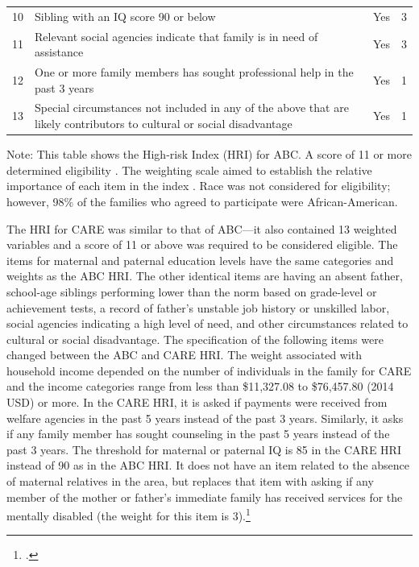 \begin{table}[htbp]
\begin{tabular}{c L{30em} c c}
10 	& Sibling with an IQ score 90 or below	& Yes & 3 \\
11	& Relevant social agencies indicate that family is in need of assistance & Yes & 3 \\
12 	& One or more family members has sought professional help in the past 3 years & Yes & 1 \\
13	& Special circumstances not included in any of the above that are likely contributors	to cultural or social disadvantage & Yes & 1 \\
\bottomrule
\end{tabular}
\justify
Note: This table shows the High-risk Index (HRI) for ABC. A score of 11 or more determined eligibility \citep{Ramey_Smith_1977_AJMD, Ramey_Campbell_1984_AJMD,Ramey_Campbell_1991_childreninpoverty,Ramey_Campbell_etal_2000_ADS}. The weighting scale aimed to establish the relative importance of each item in the index \citep{Ramey_Smith_1977_AJMD}. Race was not  considered for eligibility; however, 98\% of the families who agreed to participate were African-American\citep{Ramey_Smith_1977_AJMD,Ramey_Campbell_1979_SR}.
\end{table}

\noindent The HRI for CARE was similar to that of ABC---it also contained 13 weighted variables and a score of 11 or above was required to be considered eligible. The items for maternal and paternal education levels have the same categories and weights as the ABC HRI. The other identical items are having an absent father,  school-age siblings performing lower than the norm based on grade-level or achievement tests, a record of father's unstable job history or unskilled labor, social agencies indicating a high level of need, and other circumstances related to cultural or social disadvantage. The specification of the following items were changed between the ABC and CARE HRI. The weight associated with household income depended on the number of individuals in the family for CARE and the income categories range from less than \$11,327.08 to \$76,457.80 (2014 USD) or more. In the CARE HRI, it is asked if payments were received from welfare agencies in the past 5 years instead of the past 3 years. Similarly, it asks if any family member has sought counseling in the past 5 years instead of the past 3 years. The threshold for maternal or paternal IQ is 85 in the CARE HRI instead of 90 as in the ABC HRI.  It does not have an item related to the absence of maternal relatives in the area, but replaces that item with asking if any member of the mother or father's immediate family has received services for the mentally disabled (the weight for this item is 3).\footnote{\citet{Ramey_etal_1985_Project-CARE_TiECSE}.} \\


